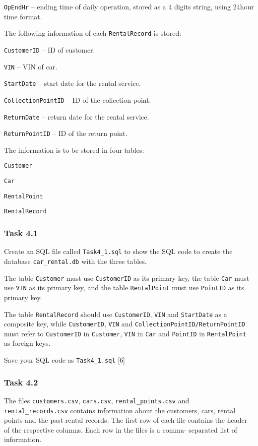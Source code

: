 \texttt{OpEndHr} -- ending time of daily operation, stored as a 4
digits string, using 24hour time format. 

The following information of each \texttt{RentalRecord} is stored: 

\texttt{CustomerID} -- ID of customer. 

\texttt{VIN} -- VIN of car. 

\texttt{StartDate} -- start date for the rental service. 

\texttt{CollectionPointID} -- ID of the collection point. 

\texttt{ReturnDate} -- return date for the rental service. 

\texttt{ReturnPointID} -- ID of the return point. 

The information is to be stored in four tables: 

\texttt{Customer} 

\texttt{Car} 

\texttt{RentalPoint} 

\texttt{RentalRecord} 

\subsubsection*{Task 4.1 }

Create an SQL file called \texttt{Task4\_1.sql} to show the SQL code
to create the database \texttt{car\_rental.db} with the three tables. 

The table \texttt{Customer} must use \texttt{CustomerID} as its primary
key, the table \texttt{Car} must use \texttt{VIN} as its primary key,
and the table \texttt{RentalPoint} must use \texttt{PointID} as its
primary key. 

The table \texttt{RentalRecord} should use \texttt{CustomerID}, \texttt{VIN}
and \texttt{StartDate} as a composite key, while \texttt{CustomerID},
\texttt{VIN} and \texttt{CollectionPointID/ReturnPointID} must refer
to \texttt{CustomerID} in \texttt{Customer}, \texttt{VIN} in \texttt{Car}
and \texttt{PointID} in \texttt{RentalPoint} as foreign keys. 

Save your SQL code as \texttt{Task4\_1.sql} \hfill{} {[}6{]}

\subsubsection*{Task 4.2 }

The files \texttt{customers.csv}, \texttt{cars.csv}, \texttt{rental\_points.csv}
and \texttt{rental\_records.csv} contains information about the customers,
cars, rental points and the past rental records. The first row of
each file contains the header of the respective columns. Each row
in the files is a comma- separated list of information. 

